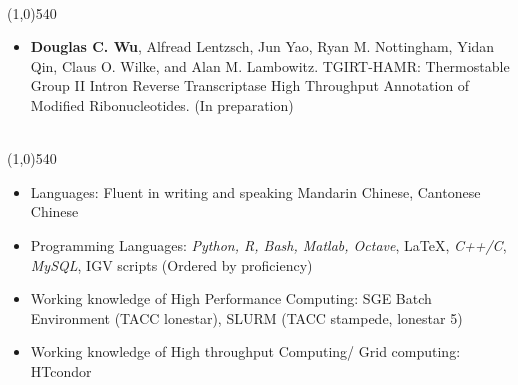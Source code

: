 \documentclass[dvips,11pt]{article}
\begin{document}
\bigskip
{} \vspace{-1.5mm}
\\\noindent
\line(1,0){540}\\
 \vspace{-6mm}
\begin{itemize}
	\setlength{\itemsep}{0pt}
	\item {\bf Douglas C. Wu}, Alfread Lentzsch, Jun Yao, Ryan M. Nottingham, Yidan Qin, Claus O. Wilke, and Alan M. Lambowitz. TGIRT-HAMR: Thermostable Group II Intron Reverse Transcriptase High Throughput Annotation of Modified Ribonucleotides. (In preparation)
\end{itemize}



 \vspace{-2mm}
\\\noindent
\vspace{-7mm}
\line(1,0){540}\\

\begin{itemize} \itemsep 1pt \parskip 0pt \parsep 0pt
	\setlength{\itemsep}{0pt}
	\item	Languages: Fluent in writing and speaking Mandarin Chinese, Cantonese Chinese
	\item	Programming Languages: {\it Python, R, Bash, Matlab, Octave}, \LaTeX, {\it C++/C},  {\it MySQL}, IGV scripts (Ordered by proficiency)
	\item Working knowledge of High Performance Computing: SGE Batch Environment (TACC lonestar), SLURM (TACC stampede, lonestar 5)
	\item Working knowledge of High throughput Computing/ Grid computing: HTcondor
\end{itemize}
\newpage
\end{document}
